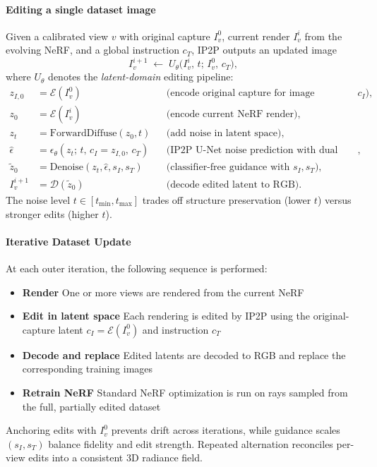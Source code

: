 \begin{enrichment}
\begin{enrichment}
        \paragraph{Editing a single dataset image}
        Given a calibrated view \(v\) with original capture \(I_v^0\), current render \(I_v^i\) from the evolving NeRF, and a global instruction \(c_T\), IP2P outputs an updated image
        \[
        I_v^{i+1} \;\leftarrow\; U_\theta\!\big(I_v^{i},\, t;\, I_v^{0},\, c_T\big),
        \]
        where \(U_\theta\) denotes the \emph{latent-domain} editing pipeline:
        \[
        \begin{aligned}
            z_{I,0} &= \mathcal{E}(I_v^0) && \text{(encode original capture for image conditioning } c_I),\\
            z_0 &= \mathcal{E}(I_v^i) && \text{(encode current NeRF render)},\\
            z_t &= \text{ForwardDiffuse}(z_0, t) && \text{(add noise in latent space)},\\
            \hat\epsilon &= \epsilon_\theta(z_t;\, t,\, c_I{=}z_{I,0},\, c_T) && \text{(IP2P U-Net noise prediction with dual conditioning)},\\
            \tilde z_0 &= \text{Denoise}(z_t,\hat\epsilon, s_I, s_T) && \text{(classifier-free guidance with } s_I, s_T),\\
            I_v^{i+1} &= \mathcal{D}(\tilde z_0) && \text{(decode edited latent to RGB)}.
        \end{aligned}
        \]
        The noise level \(t\in[t_{\min},t_{\max}]\) trades off structure preservation (lower \(t\)) versus stronger edits (higher \(t\)).
        
        \paragraph{Iterative Dataset Update}
        At each outer iteration, the following sequence is performed:
        \begin{itemize}
            \item \textbf{Render} \; One or more views are rendered from the current NeRF
            \item \textbf{Edit in latent space} \; Each rendering is edited by IP2P using the original-capture latent \(c_I=\mathcal{E}(I_v^0)\) and instruction \(c_T\)
            \item \textbf{Decode and replace} \; Edited latents are decoded to RGB and replace the corresponding training images
            \item \textbf{Retrain NeRF} \; Standard NeRF optimization is run on rays sampled from the full, partially edited dataset
        \end{itemize}
        Anchoring edits with \(I_v^0\) prevents drift across iterations, while guidance scales \((s_I,s_T)\) balance fidelity and edit strength. Repeated alternation reconciles per-view edits into a consistent 3D radiance field.
        

\end{enrichment}
\end{enrichment}
